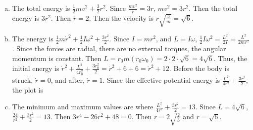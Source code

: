 \documentclass{esg8012pset}
\begin{document}
\begin{solution}
\begin{enumerate}[(a)]
  \item The total energy is $\frac{1}{2}mv^2 + \frac{3}{2}r^2$.  Since $\frac{m v^2}{r} = 3r$, $m v^2 = 3r^2$.  Then the total energy is $3r^2$.  Then $r = 2$.  Then the velocity is $r\sqrt{\frac{3}{m}} = \sqrt{6}$.
  \item The energy is $\frac{1}{2}m\dot r^2 + \frac{1}{2}I\omega^2 + \frac{3r^2}{2}$.  Since $I = mr^2$, and $L = I\omega$, $\frac{1}{2}I\omega^2 = \frac{L^2}{2I} = \frac{L^2}{2mr^2}$.  Since the forces are radial, there are no external torques, the angular momentum is constant.  Then $L = r_0m(r_0\omega_0) = 2\cdot 2 \cdot \sqrt{6} = 4\sqrt{6}$.  Thus, the initial energy is $\dot r^2 + \frac{L^2}{4r_0^2} + \frac{3r_0^2}{2} = \dot r^2 + 6 + 6 = \dot r^2 + 12$.  Before the body is struck, $\dot r = 0$, and after, $\dot r = 1$.  Since the effective potential energy is $\frac{L^2}{4r^2} + \frac{3r^2}{2}$, the plot is \par
{}
  \item The minimum and maximum values are where $\frac{L^2}{4r^2} + \frac{3r^2}{2} = 13$.  Since $L = 4\sqrt{6}$, $\frac{24}{r^2} + \frac{3r^2}{2} = 13$.  Then $3 r^4 - 26 r^2 + 48 = 0$.  Then $r = 2\sqrt{\frac{2}{3}}$ and $r = \sqrt{6}$.
\end{enumerate}
\end{solution}
\end{document}
